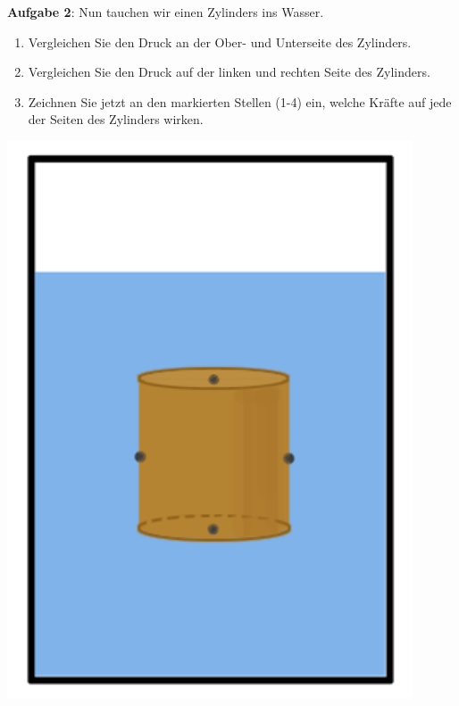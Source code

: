 \documentclass[11pt]{article}
\begin{document}
\begin{minipage}{0.65\textwidth}
    \vspace{-1cm}
    \textbf{Aufgabe 2}: Nun tauchen wir einen Zylinders ins Wasser. 
    \begin{enumerate}[label=(\alph*)]
        \item Vergleichen Sie den Druck an der Ober- und Unterseite des Zylinders. \vspace{1cm}
        \item Vergleichen Sie den Druck auf der linken und rechten Seite des Zylinders. \vspace{1cm}
        \item Zeichnen Sie jetzt an den markierten Stellen (1-4) ein, welche Kräfte auf jede der Seiten des Zylinders wirken.
    \end{enumerate}
\end{minipage}
\begin{minipage}{0.35\textwidth}
    \begin{flushright}
        \includegraphics[width=0.9\textwidth]{images/Auftrieb_A2.png}
    \end{flushright}
\end{minipage}
\vspace{1cm}
\end{document}
